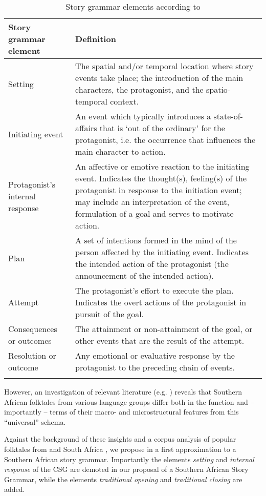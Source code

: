 \documentclass[output=paper,modfonts]{langscibook}
\begin{document}
\begin{table}
\begin{tabularx}{\textwidth}{lX}
\lsptoprule
{\bfseries Story grammar element} & {\bfseries Definition}\\
\midrule
{{Setting}} & {The spatial and/or temporal location where story events take place; the introduction of the main characters, the protagonist, and the spatio-temporal context.}\\
{{Initiating event}} & {An event which typically introduces a state-of-affairs that is ‘out of the ordinary’ for the protagonist, i.e. the occurrence that influences the main character to action.}\\
{{Protagonist’s internal response}} & {An affective or emotive reaction to the initiating event. Indicates the thought(s), feeling(s) of the protagonist in response to the initiation event; may include an interpretation of the event, formulation of a goal and serves to motivate action.}\\
{{Plan}} & {A set of intentions formed in the mind of the person affected by the initiating event. Indicates the intended action of the protagonist (the announcement of the intended action).}\\
{{Attempt}} & {The protagonist’s effort to execute the plan. Indicates the overt actions of the protagonist in pursuit of the goal.}\\
{{Consequences or outcomes}} & {The attainment or non-attainment of the goal, or other events that are the result of the attempt.}\\
{{Resolution or outcome}} & {Any emotional or evaluative response by the protagonist to the preceding chain of events.}\\
\lspbottomrule
\end{tabularx} 
\caption{Story grammar elements according to \citet{Stein1979}}
\label{tab:tappe:1}
\end{table} 

However, an investigation of relevant literature (e.g. \citealt{Canonici1990,Makgamatha1991,Motshwari1998,Obiechina1992}) reveals that Southern African folktales from various language groups differ both in the function and – importantly – terms of their macro- and microstructural features from this “universal” schema. 

Against the background of these insights and a corpus analysis of popular folktales from  and South Africa \citep{TappeInPreparation}, we propose in  a first approximation to a Southern African story grammar. Importantly the elements \textit{setting} and \textit{internal response} of the CSG are demoted in our proposal of a Southern African Story Grammar, while the elements \textit{traditional opening} and \textit{traditional closing} are added.
\end{document}
